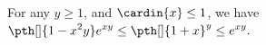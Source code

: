 \begin{lemma}
        For any $y \geq 1$, and $\cardin{x} \leq 1$, we have
        \begin{math}
            \displaystyle \pth[]{1-x^2y}e^{x y} \leq \pth[]{1+x}^{y}
            \leq e^{x y}.
        \end{math}        
    \end{lemma}
